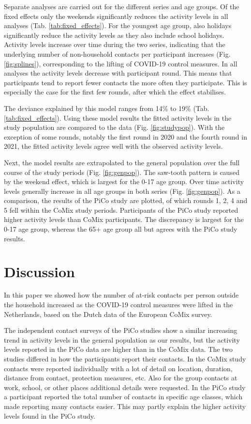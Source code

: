 \documentclass[fleqn,10pt]{wlscirep}
\begin{document}
Separate analyses are carried out for the different series and age groups. Of the fixed effects only the weekends significantly reduces the activity levels in all analyses (Tab. \ref{tab:fixed_effects}). For the youngest age group, also holidays significantly reduce the activity levels as they also include school holidays. Activity levels increase over time during the two series, indicating that the underlying number of non-household contacts per participant increases (Fig. \ref{fig:splines}), corresponding to the lifting of COVID-19 control measures. In all analyses the activity levels decrease with participant round. This means that participants tend to report fewer contacts the more often they participate. This is especially the case for the first few rounds, after which the effect stabilises.

The deviance explained by this model ranges from 14\% to 19\% (Tab. \ref{tab:fixed_effects}). Using these model results the fitted activity levels in the study population are compared to the data (Fig. \ref{fig:studypop}). With the exception of some rounds, notably the first round in 2020 and the fourth round in 2021, the fitted activity levels agree well with the observed activity levels.

Next, the model results are extrapolated to the general population over the full course of the study periods (Fig. \ref{fig:genpop}). The saw-tooth pattern is caused by the weekend effect, which is largest for the 0-17 age group. Over time activity levels generally increase in all age groups in both series (Fig. \ref{fig:genpop}). As a comparison, the results of the PiCo study \cite{Backer_2021} are plotted, of which rounds 1, 2, 4 and 5 fell within the CoMix study periods. Participants of the PiCo study reported higher activity levels than CoMix participants. The discrepancy is largest for the 0-17 age group, whereas the 65+ age group all but agrees with the PiCo study results.



\section*{Discussion}

In this paper we showed how the number of at-risk contacts per person outside the household increased as the COVID-19 control measures were lifted in the Netherlands, based on the Dutch data of the European CoMix survey.

The independent contact surveys of the PiCo studies show a similar increasing trend in activity levels in the general population as our results, but the activity levels reported in the PiCo data are higher than in the CoMix data. The two studies differed in how the participants report their contacts. In the CoMix study contacts were reported individually with a lot of detail on location, duration, distance from contact, protection measures, etc. Also for the group contacts at work, school, or other places additional details were requested. In the PiCo study a participant reported the total number of contacts in specific age classes, which made reporting many contacts easier. This may partly explain the higher activity levels found in the PiCo study.
\end{document}
